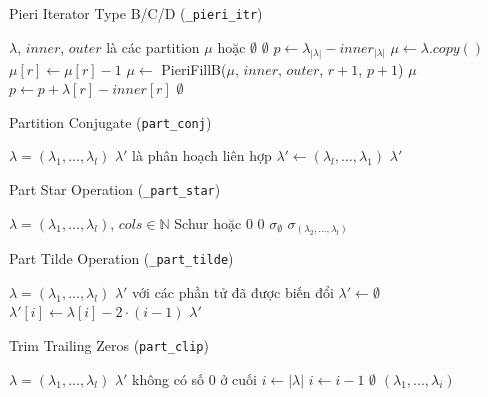 \begin{algorithm}[H]
\caption{Pieri Iterator Type B/C/D (\texttt{\_pieri\_itr})}
\begin{algorithmic}[1]
\REQUIRE $\lambda$, $inner$, $outer$ là các partition
\ENSURE $\mu$ hoặc $\emptyset$
\IF{$\lambda = \emptyset$}
    \RETURN $\emptyset$
\ENDIF
\STATE $p \gets \lambda_{|\lambda|} - inner_{|\lambda|}$
        \STATE $\mu \gets \lambda.copy()$
        \STATE $\mu[r] \gets \mu[r] - 1$
        \STATE $\mu \gets$ PieriFillB($\mu$, $inner$, $outer$, $r+1$, $p+1$)
        \IF{$\mu \neq \emptyset$}
            \RETURN $\mu$
        \ENDIF
    \ENDIF
    \STATE $p \gets p + \lambda[r] - inner[r]$
\ENDFOR
\RETURN $\emptyset$
\end{algorithmic}
\end{algorithm}

\begin{algorithm}[H]
\caption{Partition Conjugate (\texttt{part\_conj})}
\begin{algorithmic}[1]
\REQUIRE $\lambda = (\lambda_1, ..., \lambda_l)$
\ENSURE $\lambda'$ là phân hoạch liên hợp
\STATE $\lambda' \gets (\lambda_l, ..., \lambda_1)$
\RETURN $\lambda'$
\end{algorithmic}
\end{algorithm}

\begin{algorithm}[H]
\caption{Part Star Operation (\texttt{\_part\_star})}
\begin{algorithmic}[1]
\REQUIRE $\lambda = (\lambda_1, ..., \lambda_l)$, $cols \in \mathbb{N}$
\ENSURE Schur hoặc $0$
    \RETURN $0$
\ENDIF
{}
    \RETURN $\sigma_{\emptyset}$
\ENDIF
\RETURN $\sigma_{(\lambda_2, ..., \lambda_l)}$
\end{algorithmic}
\end{algorithm}

\begin{algorithm}[H]
\caption{Part Tilde Operation (\texttt{\_part\_tilde})}
\begin{algorithmic}[1]
\REQUIRE $\lambda = (\lambda_1, ..., \lambda_l)$
\ENSURE $\lambda'$ với các phần tử đã được biến đổi
\STATE $\lambda' \gets \emptyset$
    \STATE $\lambda'[i] \gets \lambda[i] - 2 \cdot (i-1)$
\ENDFOR
\RETURN $\lambda'$
\end{algorithmic}
\end{algorithm}

\begin{algorithm}[H]
\caption{Trim Trailing Zeros (\texttt{part\_clip})}
\begin{algorithmic}[1]
\REQUIRE $\lambda = (\lambda_1, ..., \lambda_l)$
\ENSURE $\lambda'$ không có số 0 ở cuối
\STATE $i \gets |\lambda|$
    \STATE $i \gets i - 1$
\ENDWHILE
{}
    \RETURN $\emptyset$
\ENDIF
\RETURN $(\lambda_1, ..., \lambda_i)$
\end{algorithmic}
\end{algorithm}